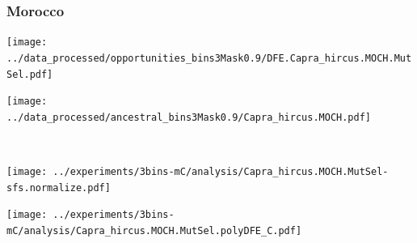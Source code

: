 \subsubsection{Morocco}

\begin{minipage}{0.49\linewidth}
    \texttt{[image: ../data\_processed/opportunities\_bins3Mask0.9/DFE.Capra\_hircus.MOCH.MutSel.pdf]}
\end{minipage}
\begin{minipage}{0.49\linewidth}
    \texttt{[image: ../data\_processed/ancestral\_bins3Mask0.9/Capra\_hircus.MOCH.pdf]}
\end{minipage}
\\
\begin{minipage}{0.49\linewidth}
    \texttt{[image: ../experiments/3bins-mC/analysis/Capra\_hircus.MOCH.MutSel-sfs.normalize.pdf]}
\end{minipage}
\begin{minipage}{0.4\linewidth}
    \texttt{[image: ../experiments/3bins-mC/analysis/Capra\_hircus.MOCH.MutSel.polyDFE\_C.pdf]}
\end{minipage}
